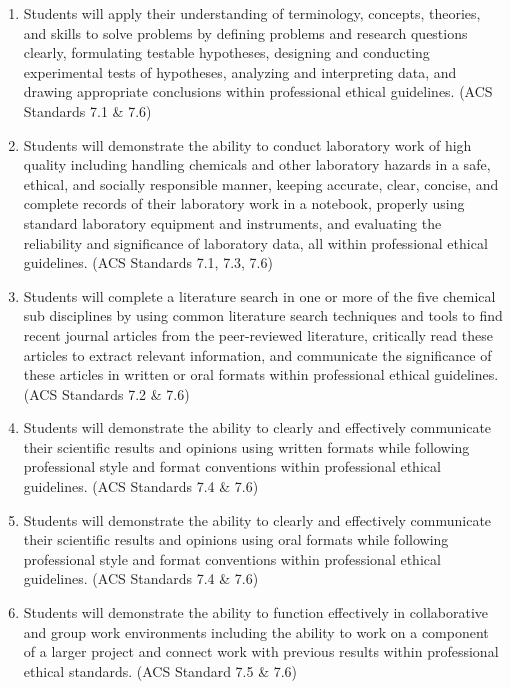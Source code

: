 \begin{enumerate}
\def\labelenumi{\arabic{enumi}.}
\tightlist
\item
  Students will apply their understanding of terminology, concepts,
  theories, and skills to solve problems by defining problems and
  research questions clearly, formulating testable hypotheses, designing
  and conducting experimental tests of hypotheses, analyzing and
  interpreting data, and drawing appropriate conclusions within
  professional ethical guidelines. (ACS Standards 7.1 \& 7.6)
\item
  Students will demonstrate the ability to conduct laboratory work of
  high quality including handling chemicals and other laboratory hazards
  in a safe, ethical, and socially responsible manner, keeping accurate,
  clear, concise, and complete records of their laboratory work in a
  notebook, properly using standard laboratory equipment and
  instruments, and evaluating the reliability and significance of
  laboratory data, all within professional ethical guidelines. (ACS
  Standards 7.1, 7.3, 7.6)
\item
  Students will complete a literature search in one or more of the five
  chemical sub disciplines by using common literature search techniques
  and tools to find recent journal articles from the peer-reviewed
  literature, critically read these articles to extract relevant
  information, and communicate the significance of these articles in
  written or oral formats within professional ethical guidelines. (ACS
  Standards 7.2 \& 7.6)
\item
  Students will demonstrate the ability to clearly and effectively
  communicate their scientific results and opinions using written
  formats while following professional style and format conventions
  within professional ethical guidelines. (ACS Standards 7.4 \& 7.6)
\item
  Students will demonstrate the ability to clearly and effectively
  communicate their scientific results and opinions using oral formats
  while following professional style and format conventions within
  professional ethical guidelines. (ACS Standards 7.4 \& 7.6)
\item
  Students will demonstrate the ability to function effectively in
  collaborative and group work environments including the ability to
  work on a component of a larger project and connect work with previous
  results within professional ethical standards. (ACS Standard 7.5 \&
  7.6)
\end{enumerate}

